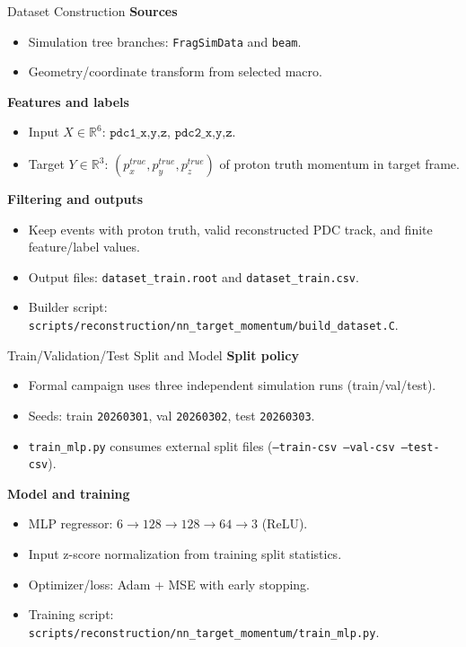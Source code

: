 \documentclass[aspectratio=169]{beamer}
\begin{document}
\begin{frame}{Dataset Construction}
\textbf{Sources}
\begin{itemize}
\item Simulation tree branches: \texttt{FragSimData} and \texttt{beam}.
\item Geometry/coordinate transform from selected macro.
\end{itemize}

\textbf{Features and labels}
\begin{itemize}
\item Input \(X\in\mathbb{R}^6\): \(\texttt{pdc1\_x,y,z}\), \(\texttt{pdc2\_x,y,z}\).
\item Target \(Y\in\mathbb{R}^3\): \((p_x^{true},p_y^{true},p_z^{true})\) of proton truth momentum in target frame.
\end{itemize}

\textbf{Filtering and outputs}
\begin{itemize}
\item Keep events with proton truth, valid reconstructed PDC track, and finite feature/label values.
\item Output files: \texttt{dataset\_train.root} and \texttt{dataset\_train.csv}.
\item Builder script: \texttt{scripts/reconstruction/nn\_target\_momentum/build\_dataset.C}.
\end{itemize}
\end{frame}

\begin{frame}{Train/Validation/Test Split and Model}
\textbf{Split policy}
\begin{itemize}
\item Formal campaign uses three independent simulation runs (train/val/test).
\item Seeds: train \texttt{20260301}, val \texttt{20260302}, test \texttt{20260303}.
\item \texttt{train\_mlp.py} consumes external split files (\texttt{--train-csv --val-csv --test-csv}).
\end{itemize}

\textbf{Model and training}
\begin{itemize}
\item MLP regressor: \(6 \rightarrow 128 \rightarrow 128 \rightarrow 64 \rightarrow 3\) (ReLU).
\item Input z-score normalization from training split statistics.
\item Optimizer/loss: Adam + MSE with early stopping.
\item Training script: \texttt{scripts/reconstruction/nn\_target\_momentum/train\_mlp.py}.
\end{itemize}
\end{frame}
\end{document}
